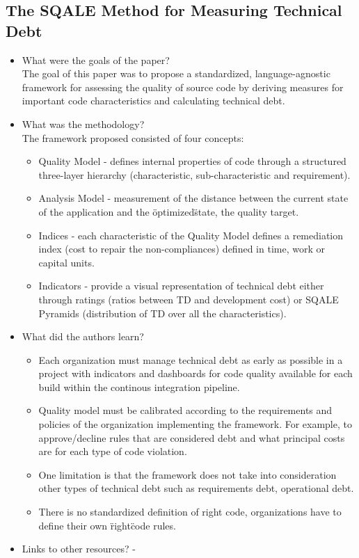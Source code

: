 \documentclass{mprop}
\begin{document}
\subsection{The SQALE Method for Measuring Technical Debt} \cite{Letouzey2012}

\begin{itemize}
	\item What were the goals of the paper? \\
		The goal of this paper was to propose a standardized, language-agnostic framework for assessing the quality of source code by deriving measures for important code characteristics and calculating technical debt.
	\item What was the methodology? \\
		The framework proposed consisted of four concepts:
		\begin{itemize}
			\item Quality Model - defines internal properties of code through a structured three-layer hierarchy (characteristic, sub-characteristic and requirement).
			\item Analysis Model - measurement of the distance between the current state of the application and the \"optimized\" state, the quality target.
			\item Indices - each characteristic of the Quality Model defines a remediation index (cost to repair the non-compliances) defined in time, work or capital units.
			\item Indicators - provide a visual representation of technical debt either through ratings (ratios between TD and development cost) or SQALE Pyramids (distribution of TD over all the characteristics).
		\end{itemize}
	\item What did the authors learn?
		\begin{itemize}
			\item Each organization must manage technical debt as early as possible in a project with indicators and dashboards for code quality available for each build within the continous integration pipeline.
			\item Quality model must be calibrated according to the requirements and policies of the organization implementing the framework. For example, to approve/decline rules that are considered debt and what principal costs are for each type of code violation.
			\item One limitation is that the framework does not take into consideration other types of technical debt such as requirements debt, operational debt.
			\item There is no standardized definition of right code, organizations have to define their own \"right\" code rules.
		\end{itemize}
	\item Links to other resources?
		-
\end{itemize}
\end{document}
